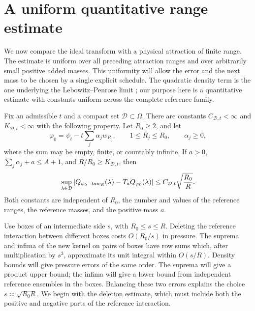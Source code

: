 \section{A uniform quantitative range estimate}
\label{k:section-range}

We now compare the ideal transform with a physical attraction of finite
range.  The estimate is uniform over all preceding attraction ranges and
over arbitrarily small positive added masses.  This uniformity will allow
the error and the next mass to be chosen by a single explicit schedule.
The quadratic density term is the one underlying the Lebowitz--Penrose
limit \citep{LebowitzPenrose1966,GerardiEtAl1973}; our purpose here is a quantitative
estimate with constants uniform across the complete reference family.

\begin{theorem}
\label{k:range}
Fix an admissible $t$ and a compact set $\mathcal D\subset\Omega$.
There are constants $C_{\mathcal D,t}<\infty$ and
$K_{\mathcal D,t}<\infty$ with the following property.  Let $R_0\ge2$,
and let
\[
 \varphi_0=\psi_t-t\sum_j\alpha_jw_{R_j},
 \qquad 1\le R_j\le R_0,
 \qquad \alpha_j\ge0,
\]
where the sum may be empty, finite, or countably infinite.  If
$a>0$, $\sum_j\alpha_j+a\le A+1$, and $R/R_0\ge K_{\mathcal D,t}$,
then
\begin{equation}
 \sup_{\lambda\in\mathcal D}
 \left|Q_{\varphi_0-ta w_R}(\lambda)-T_aQ_{\varphi_0}(\lambda)\right|
 \le C_{\mathcal D,t}\sqrt{\frac{R_0}{R}}.
 \label{k:range-estimate}
\end{equation}
Both constants are independent of $R_0$, the number and values of the
reference ranges, the reference masses, and the positive mass $a$.
\end{theorem}

Use boxes of an intermediate side $s$, with $R_0\le s\le R$.
Deleting the reference interaction between different boxes costs
$O(R_0/s)$ in pressure.  The suprema and infima of the new kernel on
pairs of boxes have row sums which, after multiplication by $s^3$,
approximate its unit integral within $O(s/R)$.  Density bounds will give
pressure errors of the same order.  The suprema will give a product upper
bound; the infima will give a lower bound from independent reference
ensembles in the boxes.  Balancing these two errors explains
the choice $s\asymp\sqrt{R_0R}$.  We begin with the deletion estimate,
which must include both the positive and negative parts of the reference
interaction.

